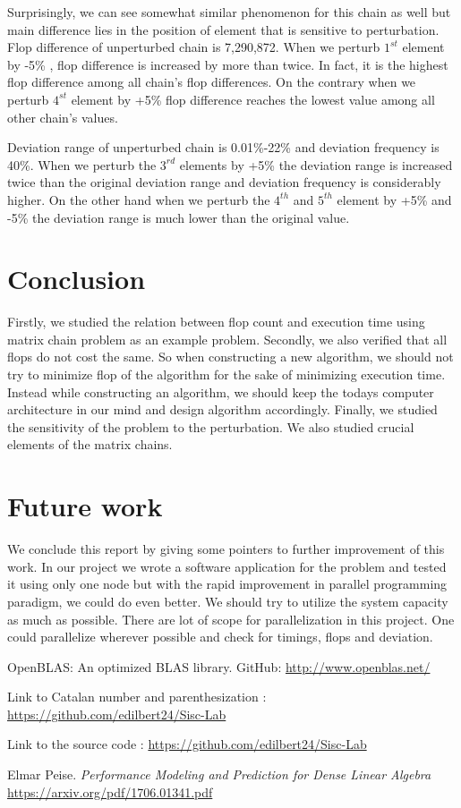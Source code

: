 \documentclass[10pts]{article}
\begin{document}
Surprisingly, we can see somewhat similar phenomenon for this chain as well but main difference lies in the position of element that is sensitive to perturbation. Flop difference of unperturbed chain is 7,290,872. When we perturb $1^{st}$ element by -5\% , flop difference is increased by more than twice. In fact, it is the highest flop difference among all chain's flop differences. On the contrary when we perturb  $4^{st}$ element by +5\% flop difference reaches the lowest value among all other chain's values.

Deviation range of unperturbed chain is 0.01\%-22\% and deviation frequency is 40\%.  When we perturb the $3^{rd}$ elements by +5\% the deviation range is increased twice than the original deviation range and deviation frequency is considerably higher. On the other hand when we perturb the $4^{th}$ and $5^{th}$ element by +5\% and -5\% the deviation range is  much lower than the original value.
 
\section{Conclusion}
Firstly, we studied the relation between flop count and execution time using matrix chain problem as an example problem. Secondly, we also verified that all flops do not cost the same. So when constructing a new algorithm, we should not try to minimize flop of the algorithm for the sake of minimizing execution time. Instead while constructing an algorithm, we should keep the todays computer architecture in our mind and design algorithm accordingly. Finally, we studied the sensitivity of the problem to the perturbation. We also studied crucial elements of the matrix chains.  
\section{Future work}
We conclude this report by giving some pointers to further improvement of this work. In our project we wrote a software application for the problem and tested it using only one node but with the rapid improvement in parallel programming paradigm, we could do even better. We should try to utilize the system capacity as much as possible. There are lot of scope for parallelization in this project. One could parallelize wherever possible and check for timings, flops and deviation.        

\begin{thebibliography}{99}

OpenBLAS: An optimized BLAS library. GitHub:  \url{http://www.openblas.net/}

Link to Catalan number and parenthesization : \url{https://github.com/edilbert24/Sisc-Lab}

Link to the source code : \url{https://github.com/edilbert24/Sisc-Lab}

Elmar Peise. {\sl Performance Modeling and Prediction for Dense Linear Algebra}\\ \url{https://arxiv.org/pdf/1706.01341.pdf}

\end{thebibliography}
	
\end{document}
